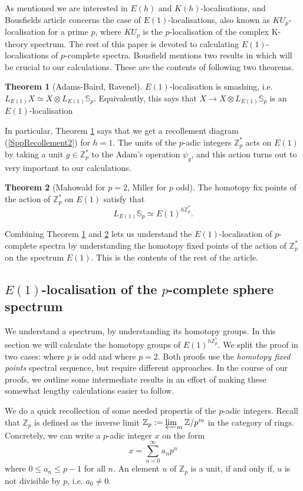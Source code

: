 \documentclass[a4paper]{article} %
\theoremstyle{definition}
\newtheorem{theorem}{Theorem} %
\newcommand{\Z}{\mathbb{Z}}
\begin{document}
As mentioned we are interested in $E(h)$ and $K(h)$-localisations, and Bousfields article \cite{bousfield1979localization} concerns the case of $E(1)$-localisations, also known as $KU_p$-localisation for a prime $p$, where $KU_p$ is the $p$-localisation of the complex K-theory spectrum. The rest of this paper is devoted to calculating $E(1)$-localisations of $p$-complete spectra. Bousfield mentions two results in \cite{bousfield1979localization} which will be crucial to our calculations. These are the contents of following two theorems.
\begin{theorem}[Adams-Baird, Ravenel]\label{Adams-Baird, Ravenel}
  $E(1)$-localisation is smashing, i.e. $L_{E(1)}X \simeq X \otimes L_{E(1)} \mathbb{S}_p$. Equivalently, this says that $X \to X \otimes L_{E(1)} \mathbb{S}_p$ is an $E(1)$-localisation
\end{theorem}
In particular, Theorem \ref{Adams-Baird, Ravenel} says that we get a recollement diagram (\ref{SppRecollement2}) for $h=1$. The units of the $p$-adic integers $\Z_p^*$ acts on $E(1)$ by taking a unit $g \in \Z_p^*$ to the Adam's operation $\psi_g$, and this action turns out to very important to our calculations.
\begin{theorem}[Mahowald for $p=2$, Miller for $p$ odd]\label{Mahowald, Miller}
   The homotopy fix points of the action of $\Z_p^*$ on $E(1)$ satisfy that
     $$L_{E(1)}\mathbb{S}_p \simeq E(1)^{h\Z_p^*}.$$
\end{theorem}
Combining Theorem \ref{Adams-Baird, Ravenel} and \ref{Mahowald, Miller} lets us understand the $E(1)$-localisation of $p$-complete spectra by understanding the homotopy fixed points of the action of $\Z_p^*$ on the spectrum $E(1)$. This is the contents of the rest of the article.

\subsection{$E(1)$-localisation of the $p$-complete sphere spectrum}

We understand a spectrum, by understanding its homotopy groups. In this section we will calculate the homotopy groups of $E(1)^{h\Z_p^*}$. We split the proof in two cases: where $p$ is odd and where $p=2$. Both proofs use the \textit{homotopy fixed points} spectral sequence, but require different approaches. In the course of our proofs, we outline some intermediate results in an effort of making these somewhat lengthy calculations easier to follow.

We do a quick recollection of some needed propertis of the $p$-adic integers. Recall that $\Z_p$ is defined as the inverse limit $\Z_p := \varprojlim_m \Z/p^m$ in the category of rings. Concretely, we can write a $p$-adic integer $x$ on the form
\[
  x=\sum_{n = 0}^\infty a_n p^n
\]
where $ 0 \le a_n \le p-1$ for all $n$.
An element $u$ of $\Z_p$ is a unit, if and only if, $u$ is not divisible by $p$, i.e. $a_0 \neq 0$.
\end{document}
